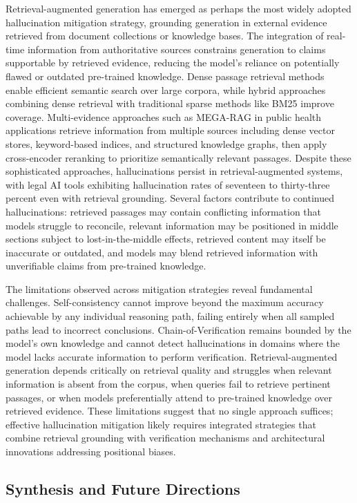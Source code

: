 Retrieval-augmented generation has emerged as perhaps the most widely adopted hallucination mitigation strategy, grounding generation in external evidence retrieved from document collections or knowledge bases. The integration of real-time information from authoritative sources constrains generation to claims supportable by retrieved evidence, reducing the model's reliance on potentially flawed or outdated pre-trained knowledge. Dense passage retrieval methods enable efficient semantic search over large corpora, while hybrid approaches combining dense retrieval with traditional sparse methods like BM25 improve coverage. Multi-evidence approaches such as MEGA-RAG in public health applications retrieve information from multiple sources including dense vector stores, keyword-based indices, and structured knowledge graphs, then apply cross-encoder reranking to prioritize semantically relevant passages. Despite these sophisticated approaches, hallucinations persist in retrieval-augmented systems, with legal AI tools exhibiting hallucination rates of seventeen to thirty-three percent even with retrieval grounding. Several factors contribute to continued hallucinations: retrieved passages may contain conflicting information that models struggle to reconcile, relevant information may be positioned in middle sections subject to lost-in-the-middle effects, retrieved content may itself be inaccurate or outdated, and models may blend retrieved information with unverifiable claims from pre-trained knowledge.

The limitations observed across mitigation strategies reveal fundamental challenges. Self-consistency cannot improve beyond the maximum accuracy achievable by any individual reasoning path, failing entirely when all sampled paths lead to incorrect conclusions. Chain-of-Verification remains bounded by the model's own knowledge and cannot detect hallucinations in domains where the model lacks accurate information to perform verification. Retrieval-augmented generation depends critically on retrieval quality and struggles when relevant information is absent from the corpus, when queries fail to retrieve pertinent passages, or when models preferentially attend to pre-trained knowledge over retrieved evidence. These limitations suggest that no single approach suffices; effective hallucination mitigation likely requires integrated strategies that combine retrieval grounding with verification mechanisms and architectural innovations addressing positional biases.

\subsection{Synthesis and Future Directions}

